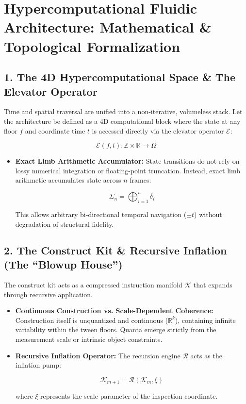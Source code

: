 \chapter{\texorpdfstring{Hypercomputational Fluidic Architecture: Mathematical \& Topological Formalization}{Hypercomputational Fluidic Architecture: Mathematical \& Topological Formalization}}
\label{chap:fluidic-2-elevator-identity-entropy}

\section{\texorpdfstring{1. The 4D Hypercomputational Space \& The Elevator Operator}{1. The 4D Hypercomputational Space \& The Elevator Operator}}

Time and spatial traversal are unified into a non-iterative, volumeless stack. Let the architecture be defined as a 4D computational block where the state at any floor \(f\) and coordinate time \(t\) is accessed directly via the elevator operator \(\mathcal{E}\):

\[
\mathcal{E}(f, t) : \mathbb{Z} \times \mathbb{R} \to \Omega
\]

\begin{itemize}
\item \textbf{Exact Limb Arithmetic Accumulator:} State transitions do not rely on lossy numerical integration or floating-point truncation. Instead, exact limb arithmetic accumulates state across \(n\) frames:

\[
\Sigma_n = \bigoplus_{i=1}^{n} \delta_i
\]

This allows arbitrary bi-directional temporal navigation (\(\pm t\)) without degradation of structural fidelity.
\end{itemize}

\medskip

\section{\texorpdfstring{2. The Construct Kit \& Recursive Inflation (The “Blowup House”)}{2. The Construct Kit \& Recursive Inflation (The "Blowup House")}}

The construct kit acts as a compressed instruction manifold \(\mathcal{K}\) that expands through recursive application.

\begin{itemize}
\item \textbf{Continuous Construction vs. Scale-Dependent Coherence:} Construction itself is unquantized and continuous (\(\mathbb{R}^k\)), containing infinite variability within the tween floors. Quanta emerge strictly from the measurement scale or intrinsic object constraints.
\item \textbf{Recursive Inflation Operator:} The recursion engine \(\mathcal{R}\) acts as the inflation pump:

\[
\mathcal{K}_{m+1} = \mathcal{R}(\mathcal{K}_m, \xi)
\]

where \(\xi\) represents the scale parameter of the inspection coordinate.
\end{itemize}

